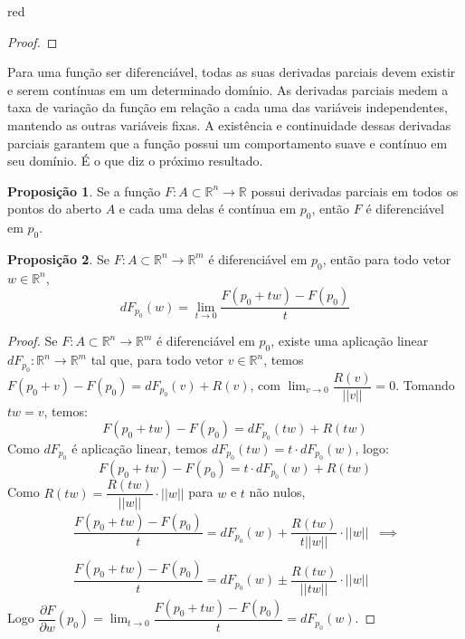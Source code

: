 \documentclass[12pt,leqno,twoside]{amsart}
\theoremstyle{definition}
\newtheorem{proposicao}{Proposição}[section]
\begin{document}
\begin{color}{red}
\begin{proof}
\end{proof}

\vspace{0.3cm}


Para uma função ser diferenciável, todas as suas derivadas parciais devem existir e serem contínuas em um determinado domínio. As derivadas parciais medem a taxa de variação da função em relação a cada uma das variáveis independentes, mantendo as outras variáveis fixas. A existência e continuidade dessas derivadas parciais garantem que a função possui um comportamento suave e contínuo em seu domínio. É o que diz o próximo resultado.

\vspace{0.3cm}

\begin{proposicao}\cite[Proposição XX]{E2} \label{prop:dif0} 	Se a função  $F:A\subset \mathbb{R}^n \to \mathbb{R}$ possui derivadas parciais em todos os pontos do aberto $A$ e cada uma delas é contínua em $p_0$, então   $F$ é diferenciável em $p_0$.
\end{proposicao}

\vspace{0.3cm}

\begin{proposicao}
	\label{prop:dif1}
	Se $F:A\subset \mathbb{R}^n \to \mathbb{R}^m$ é diferenciável em $p_0$, então para todo vetor $w\in \mathbb{R}^n$,
	$$ dF_{p_0}(w) = \displaystyle\lim_{t\to 0}\dfrac{F(p_0+tw) -F(p_0)}{t}$$

\end{proposicao}
\begin{proof}
	Se $F:A\subset \mathbb{R}^n \to \mathbb{R}^m$ é diferenciável em $p_0$, existe uma aplicação linear $dF_{p_0}:\mathbb{R}^n \to \mathbb{R}^m$ tal que, para todo vetor $v \in \mathbb{R}^n$, temos $F(p_0+v)-F(p_0) = dF_{p_0}(v)+R(v)$,  com $\displaystyle\lim_{v\to 0} \dfrac{R(v)}{||v||} = 0$.
	Tomando $ tw = v$, temos:
	$$ F(p_0+tw)-F(p_0) = dF_{p_0}(tw)+R(tw)$$
	Como $dF_{p_0}$ é aplicação linear, temos $dF_{p_0}(tw) = t\cdot dF_{p_0}(w)$, logo:
	$$ F(p_0+tw)-F(p_0) = t\cdot dF_{p_0}(w)+R(tw)$$
	Como $R(tw) = \dfrac{R(tw)}{||w||} \cdot ||w||$ para $w$ e $t$ não nulos,
	\begin{align*}
		\dfrac{F(p_0+tw)-F(p_0)}{t} =  dF_{p_0}(w)+\dfrac{R(tw)}{t||w||}\cdot ||w|| &\implies\\~\\
		\dfrac{F(p_0+tw)-F(p_0)}{t} =  dF_{p_0}(w)\pm \dfrac{R(tw)}{||t w||}\cdot ||w||
	\end{align*}
	Logo $ \dfrac{\partial F}{\partial w} (p_0) = \displaystyle\lim_{t\to 0} \dfrac{F(p_0+tw)-F(p_0)}{t} =  dF_{p_0}(w)$.


\end{proof}
\end{color}
\end{document}
